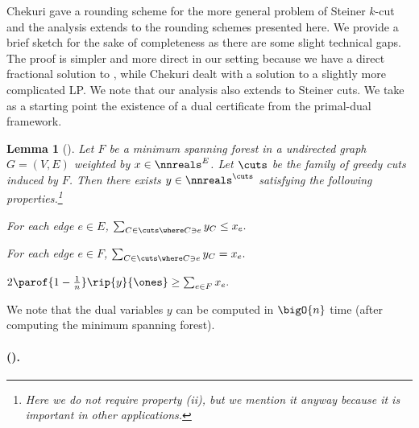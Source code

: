 \documentclass[11pt]{article}
\numberwithin{equation}{section}
\newtheorem{lemma}[theorem]{Lemma}
\theoremstyle{definition}
\theoremstyle{plain}
\begin{document}
Chekuri \etal \cite{cgn-06} gave a rounding scheme for the more
general problem of Steiner $k$-cut and the analysis extends to the
rounding schemes presented here. We provide a brief sketch for the
sake of completeness as there are some slight technical gaps. The
proof is simpler and more direct in our setting because we have a
direct fractional solution to , while Chekuri \etal
\cite{cgn-06} dealt with a solution to a slightly more complicated
LP. We note that our analysis also extends to Steiner cuts.  We take
as a starting point the existence of a dual certificate from the
primal-dual framework.

\begin{lemma}[{\cite{gw-95,gw-96}}]
   Let $F$ be a minimum spanning forest in a
  undirected graph $G = (V,E)$ weighted by $x \in \nnreals^{E}$. Let
  $\cuts$ be the family of greedy cuts induced by $F$. Then there
  exists $y \in \nnreals^{\cuts}$ satisfying the following
  properties.\footnote{Here we do not require property (ii), but we
    mention it anyway because it is important in other applications.}
  \begin{mathresults}
  \item For each edge $e \in E$,
    \begin{math}
      \sum_{C \in \cuts \where C \ni e} y_C \leq x_e.
    \end{math}
  \item For each edge $e \in F$,
    \begin{math}
      \sum_{C \in \cuts \where C \ni e} y_C = x_e.
    \end{math}
  \item
    \begin{math}
      2 \parof{1 - \frac{1}{n}}\rip{y}{\ones} \geq \sum_{e \in F} x_e.
    \end{math}
  \end{mathresults}
\end{lemma}

We note that the dual variables $y$ can be computed in $\bigO{n}$ time
(after computing the minimum spanning forest).

%
%
%
%
%
%

%
%
%
%

\paragraph{ {\normalfont
    (\cite{cgn-06})}.}{\emph{\GreedyCutsApx}}
\end{document}
